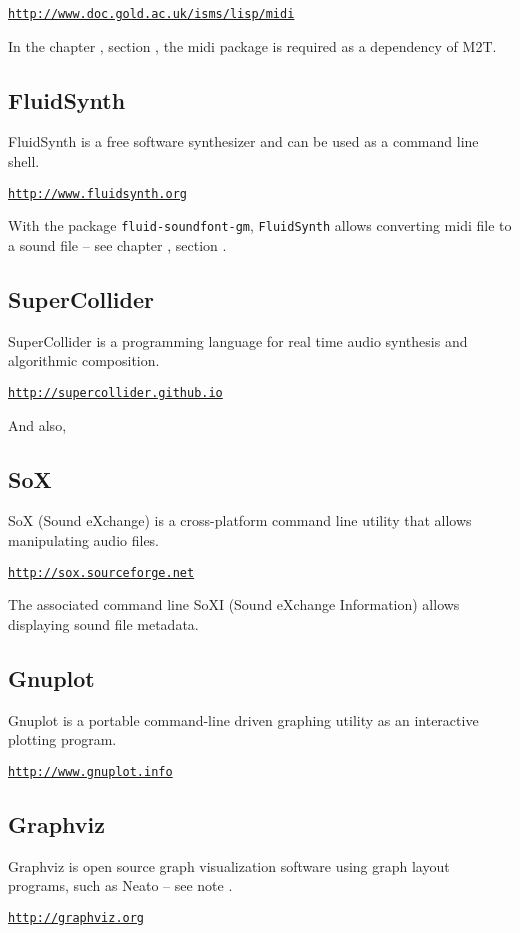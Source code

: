 \href{http://www.doc.gold.ac.uk/isms/lisp/midi}{\texttt{\small http://www.doc.gold.ac.uk/isms/lisp/midi}}

\bigskip

In the chapter \textsl{}, section \textsl{}, the midi package is required as a dependency of M2T.

\subsection*{FluidSynth}

FluidSynth is a free software synthesizer and can be used as a command line shell.

\href{http://www.fluidsynth.org}{\texttt{\small http://www.fluidsynth.org}}

\bigskip

With the package \texttt{fluid-soundfont-gm}, \texttt{FluidSynth} allows converting midi file to a sound file -- see chapter \textsl{}, section \textsl{}.

\subsection*{SuperCollider}

SuperCollider is a programming language for real time audio synthesis and algorithmic composition.

\href{http://supercollider.github.io}{\texttt{\small http://supercollider.github.io}}

\bigskip

\noindent And also,

\subsection*{SoX}

SoX (Sound eXchange) is a cross-platform command line utility that allows manipulating audio files.

\href{http://sox.sourceforge.net}{\texttt{\small http://sox.sourceforge.net}}

\bigskip

The associated command line SoXI (Sound eXchange Information) allows displaying sound file metadata.

\subsection*{Gnuplot}

Gnuplot is a portable command-line driven graphing utility as an interactive plotting program.

\href{http://www.gnuplot.info}{\texttt{\small http://www.gnuplot.info}}

\subsection*{Graphviz}

Graphviz is open source graph visualization software using graph layout programs, such as Neato -- see note .

\href{http://graphviz.org}{\small{\texttt{http://graphviz.org}}}